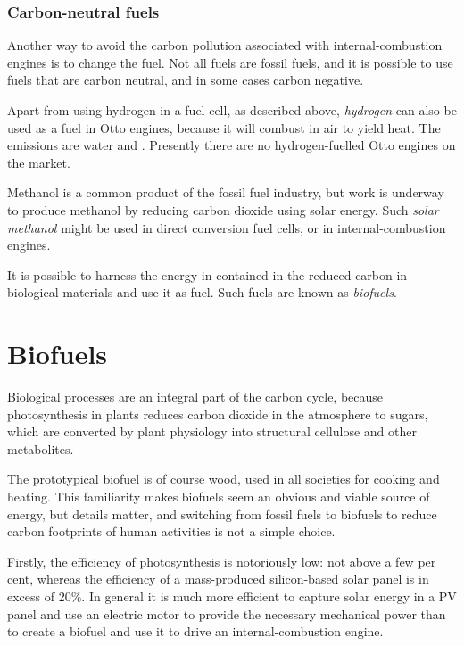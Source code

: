 \subsubsection{Carbon-neutral fuels} 

Another way to avoid the carbon pollution associated with internal-combustion
engines is to change the fuel. Not all fuels are fossil fuels, and it is
possible to use fuels that are carbon neutral, and in some cases carbon
negative.

Apart from using hydrogen in a fuel cell, as described above, \textit{hydrogen}
can also be used as a fuel in Otto engines, because it will combust in air to
yield heat. The emissions are water and \nox. Presently there are no
hydrogen-fuelled Otto engines on the market.

Methanol is a common product of the fossil fuel industry, but work is underway
to produce methanol by reducing carbon dioxide using solar energy. Such
\textit{solar methanol} might be used in direct conversion fuel cells, or in
internal\hyp{}combustion engines.

It is possible to harness the energy in contained in the reduced carbon in
biological materials and use it as fuel. Such fuels are known as
\textit{biofuels}.

\section{Biofuels}

Biological processes are an integral part of the carbon cycle, because
photosynthesis in plants reduces carbon dioxide in the atmosphere to sugars,
which are converted by plant physiology into structural cellulose and other
metabolites.

The prototypical biofuel is of course wood, used in all societies for cooking
and heating. This familiarity makes biofuels seem an obvious and viable
source of energy, but details matter, and switching from fossil fuels to
biofuels to reduce carbon footprints of human activities is not a simple choice.

Firstly, the efficiency of photosynthesis is notoriously low: not above a few
per cent, whereas the efficiency of a mass-produced silicon-based solar panel is
in excess of 20\%. In general it is much more efficient to capture solar energy
in a PV panel and use an electric motor to provide the necessary mechanical
power than to create a biofuel and use it to drive an internal-combustion
engine.
 
